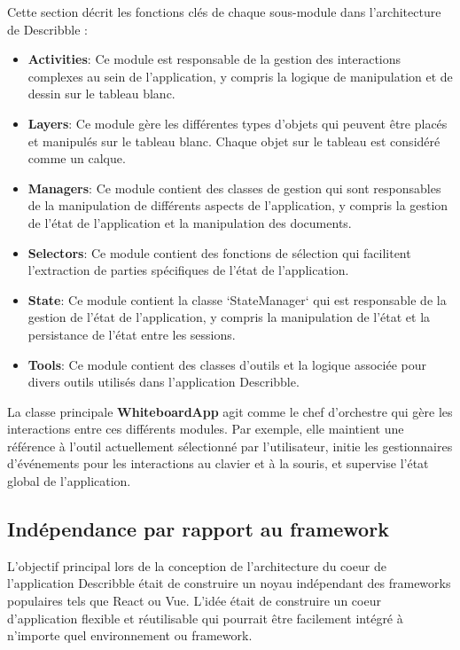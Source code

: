 Cette section décrit les fonctions clés de chaque sous-module dans l'architecture de Describble :

\begin{itemize}
    \item \textbf{Activities}: Ce module est responsable de la gestion des interactions complexes au sein de l'application, y compris la logique de manipulation et de dessin sur le tableau blanc.

    \item \textbf{Layers}: Ce module gère les différentes types d'objets qui peuvent être placés et manipulés sur le tableau blanc. Chaque objet sur le tableau est considéré comme un calque.

    \item \textbf{Managers}: Ce module contient des classes de gestion qui sont responsables de la manipulation de différents aspects de l'application, y compris la gestion de l'état de l'application et la manipulation des documents.

    \item \textbf{Selectors}: Ce module contient des fonctions de sélection qui facilitent l'extraction de parties spécifiques de l'état de l'application.

    \item \textbf{State}: Ce module contient la classe `StateManager` qui est responsable de la gestion de l'état de l'application, y compris la manipulation de l'état et la persistance de l'état entre les sessions.

    \item \textbf{Tools}: Ce module contient des classes d'outils et la logique associée pour divers outils utilisés dans l'application Describble.
\end{itemize}

La classe principale \textbf{WhiteboardApp}  agit comme le chef d'orchestre qui gère les interactions entre ces différents modules. Par exemple, elle maintient une référence à l'outil actuellement sélectionné par l'utilisateur, initie les gestionnaires d'événements pour les interactions au clavier et à la souris, et supervise l'état global de l'application.

\subsection{Indépendance par rapport au framework}

L'objectif principal lors de la conception de l'architecture du coeur de l'application Describble était de construire un noyau indépendant des frameworks populaires tels que React ou Vue. L'idée était de construire un coeur d'application flexible et réutilisable qui pourrait être facilement intégré à n'importe quel environnement ou framework.

